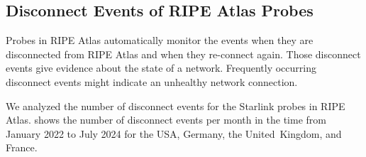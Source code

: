\subsection{Disconnect Events of RIPE Atlas Probes} \label{sec:disconnect-events}

Probes in RIPE Atlas automatically monitor the events when they are
disconnected from RIPE Atlas and when they re-connect again. Those disconnect
events give evidence about the state of a network. Frequently occurring
disconnect events might indicate an unhealthy network connection.

We analyzed the number of disconnect events for the Starlink probes in RIPE
Atlas.  shows the number of disconnect
events per month in the time from January 2022 to July 2024 for the USA,
Germany, the United~Kingdom, and France.

